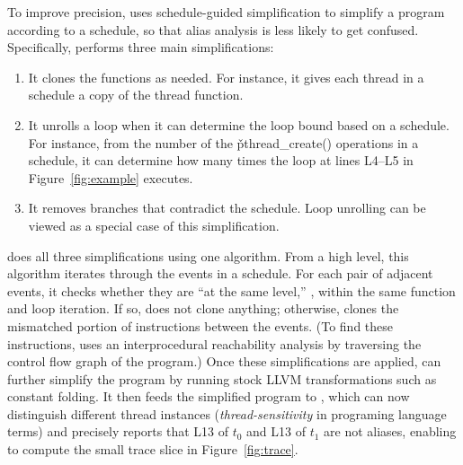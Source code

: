


To improve precision, \peregrine uses schedule-guided simplification to simplify
a program according to a schedule, so that 
alias analysis is less likely to get confused.  
Specifically, \peregrine performs three main simplifications:

\begin{enumerate}

\item It clones the functions as needed.  For instance, it gives
  each thread in a schedule a copy of the thread function.

\item It unrolls a loop when it can determine the loop bound based on a
  schedule.  For instance, from the number of the \v{pthread\_create()}
  operations in a schedule, it can determine how many times the loop at
  lines L4--L5 in Figure~\ref{fig:example} executes.

\item It removes branches that contradict the schedule.  Loop unrolling
  can be viewed as a special case of this simplification.

\end{enumerate}

\peregrine does all three simplifications using one algorithm.  From a high
level, this algorithm iterates through the events in a schedule.  For each
pair of adjacent events, it checks whether they are ``at the same level,''
\ie, within the same function and loop iteration.  If so, \peregrine does
not clone anything; otherwise, \peregrine clones the mismatched portion of
instructions between the events.  (To find these instructions, \peregrine uses an
interprocedural reachability analysis by traversing the control flow graph
of the program.)  Once these simplifications are applied, \peregrine can further
simplify the program by running stock LLVM transformations such as
constant folding.  It then feeds the simplified program to \bddbddb,
which can now
distinguish different thread instances (\emph{thread-sensitivity} in
programing language terms) and precisely reports that L13
of $t_0$ and L13 of $t_1$
are not aliases, enabling \peregrine to compute the small trace slice in
Figure~\ref{fig:trace}.

